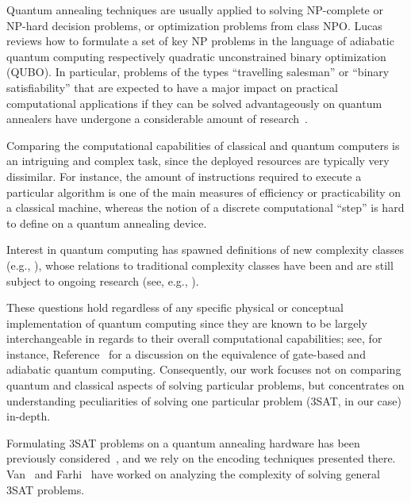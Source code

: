 Quantum annealing techniques are usually applied to solving NP-complete or NP-hard decision problems, or optimization problems from class NPO. Lucas~\cite{lucas2014ising} reviews how to formulate a set of key NP problems in the language of adiabatic quantum computing respectively quadratic unconstrained binary optimization (QUBO). In particular, problems of the types ``travelling salesman'' or ``binary satisfiability'' that are expected to have a major impact on practical computational applications if they can be solved advantageously on quantum annealers have undergone a considerable amount of research~\cite{heim2017designing,warren2017small,moylett2017quantum,strand2017zzz,benjamin2017measurement}.

Comparing the computational capabilities of classical and quantum computers
is an intriguing and complex task, since the deployed resources are typically very dissimilar. For instance, the amount of instructions required
to execute a particular algorithm is one of the main measures of efficiency
or practicability on a classical machine, whereas the notion of a discrete
computational ``step'' is hard to define on a quantum annealing device.

Interest in quantum computing has spawned definitions of new complexity classes (e.g., \cite{klauck2017complexity,morimae2017merlinization}), whose relations to traditional complexity classes have been and are still subject to ongoing research (see, e.g., \cite{bernstein1997quantum,marriott2005quantum}).


These questions hold regardless of any specific physical or conceptual implementation of quantum computing since they are known to be largely interchangeable in regards to their overall computational capabilities; see, for instance, Reference~\cite{mcgeoch2014adiabatic} for a discussion on the
equivalence of gate-based and adiabatic quantum computing. Consequently,
our work focuses not on comparing quantum and classical aspects of solving particular problems, but concentrates on understanding peculiarities
of solving one particular problem (3SAT, in our case) in-depth.

Formulating 3SAT problems on a quantum annealing hardware has been previously considered~\cite{choi2011different,choi2010adiabatic,farhi2000quantum}, and we rely on the encoding techniques presented there. Van~\cite{van2001powerful} and Farhi~\cite{farhi2009quantum} have worked on analyzing the complexity of solving general 3SAT problems.
